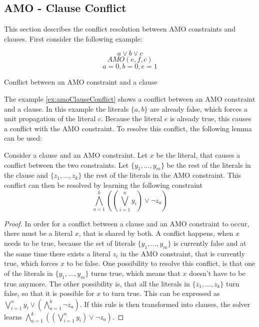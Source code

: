 \subsection{AMO - Clause Conflict}

This section describes the conflict resolution between AMO constraints and clauses. First consider the following example:

\begin{example}
\begin{leftbar}
\begin{displaymath}
a \vee b \vee c
\end{displaymath}
\begin{displaymath}
AMO(e,f,c)
\end{displaymath}
\begin{displaymath}
a = 0, b = 0, e = 1
\end{displaymath}
\end{leftbar}
\caption{Conflict between an AMO constraint and a clause}
\label{ex:amoClauseConflict}
\end{example}

The example \ref{ex:amoClauseConflict} shows a conflict between an AMO constraint and a clause. In this example the literals $\{a,b\}$ are already false, which forces a unit propagation of the literal $c$. Because the literal $e$ is already true, this causes a conflict with the AMO constraint. To resolve this conflict, the following lemma can be used:

\begin{lemma}
\begin{leftbar}
Consider a clause and an AMO constraint. Let $x$ be the literal, that causes a conflict between the two constraints. Let $\{y_1,...,y_m\}$ be the rest of the literals in the clause and $\{z_1,...,z_k\}$ the rest of the literals in the AMO constraint.
This conflict can then be resolved by learning the following constraint
\begin{displaymath}
\bigwedge_{a=1}^{k}((\bigvee_{i=1}^{n}y_i)\vee \neg z_a)
\end{displaymath}

\end{leftbar}
\label{le:amoClauseConflict}
\end{lemma}

\begin{proof}
In order for a conflict between a clause and an AMO constraint to occur, there must be a literal $x$, that is shared by both. A conflict happens, when $x$ needs to be true, because the set of literals $\{y_1,...,y_m\}$ is currently false and at the same time there exists a literal $z_i$ in the AMO constraint, that is currently true, which forces $x$ to be false. One possibility to resolve this conflict, is that one of the literals in $\{y_1,...,y_m\}$ turns true, which means that $x$ doesn't have to be true anymore. The other possibility is, that all the literals in $\{z_1,...,z_k\}$ turn false, so that it is possible for $x$ to turn true. This can be expressed as $\bigvee_{i=1}^{n}y_i \vee (\bigwedge_{a=1}^{k}\neg z_a)$. If this rule is then transformed into clauses, the solver learns $\bigwedge_{a=1}^{k}((\bigvee_{i=1}^{n}y_i)\vee \neg z_a)$.
\end{proof}

